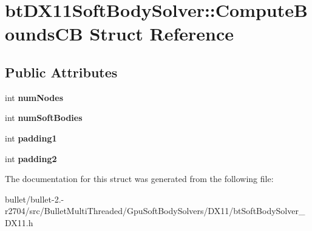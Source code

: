 \hypertarget{structbt_d_x11_soft_body_solver_1_1_compute_bounds_c_b}{\section{bt\+D\+X11\+Soft\+Body\+Solver\+:\+:Compute\+Bounds\+C\+B Struct Reference}
\label{structbt_d_x11_soft_body_solver_1_1_compute_bounds_c_b}
}
\subsection*{Public Attributes}
\begin{DoxyCompactItemize}
\item 
\hypertarget{structbt_d_x11_soft_body_solver_1_1_compute_bounds_c_b_a4ae55180f8fecc1e4d02e7d5151a7e9a}{int {\bfseries num\+Nodes}}\label{structbt_d_x11_soft_body_solver_1_1_compute_bounds_c_b_a4ae55180f8fecc1e4d02e7d5151a7e9a}

\item 
\hypertarget{structbt_d_x11_soft_body_solver_1_1_compute_bounds_c_b_aa17e0bd97d45f3893409d6777b62c192}{int {\bfseries num\+Soft\+Bodies}}\label{structbt_d_x11_soft_body_solver_1_1_compute_bounds_c_b_aa17e0bd97d45f3893409d6777b62c192}

\item 
\hypertarget{structbt_d_x11_soft_body_solver_1_1_compute_bounds_c_b_a7ebc9705e5a6e5ef2a513d2924b60474}{int {\bfseries padding1}}\label{structbt_d_x11_soft_body_solver_1_1_compute_bounds_c_b_a7ebc9705e5a6e5ef2a513d2924b60474}

\item 
\hypertarget{structbt_d_x11_soft_body_solver_1_1_compute_bounds_c_b_a8d254459a631d5abd5e770a8a06c989f}{int {\bfseries padding2}}\label{structbt_d_x11_soft_body_solver_1_1_compute_bounds_c_b_a8d254459a631d5abd5e770a8a06c989f}

\end{DoxyCompactItemize}


The documentation for this struct was generated from the following file\+:\begin{DoxyCompactItemize}
\item 
bullet/bullet-\/2.-\/r2704/src/\+Bullet\+Multi\+Threaded/\+Gpu\+Soft\+Body\+Solvers/\+D\+X11/bt\+Soft\+Body\+Solver\+\_\+\+D\+X11.\+h\end{DoxyCompactItemize}
